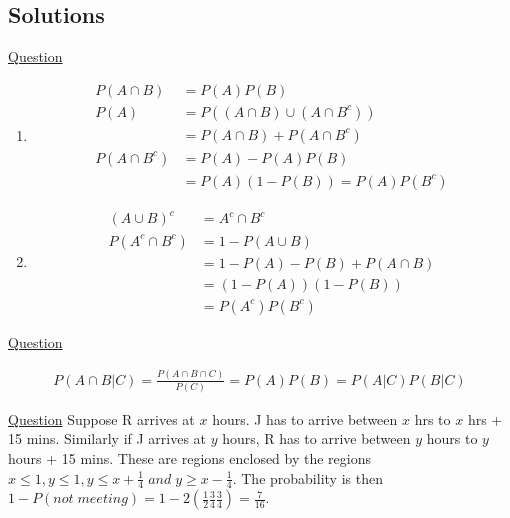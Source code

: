 \documentclass[../probability-notes.tex]{subfiles}
\begin{document}
    \subsection{Solutions}
    \begin{enumerate}
        \item \hypertarget{a_indcomp}{\hyperlink{q_indcomp}{Question}}
        \begin{enumerate}
            \item 
            \begin{align*}
                P(A \cap B) &= P(A) P(B)\\
                P(A) &= P((A \cap B) \cup (A \cap B^{c}))\\
                    &= P(A \cap B) + P(A \cap B^{c}) \tag*{since disjoint}\\
                P(A \cap B^{c}) &= P(A) - P(A)P(B)\\
                    &= P(A)(1 - P(B)) = P(A)P(B^{c})
            \end{align*}
            \item 
            \begin{align*}
                (A \cup B)^{c} &= A^{c} \cap B^{c}\\
                P(A^{c} \cap B^{c}) &= 1 - P(A \cup B)\\
                                &= 1 - P(A) - P(B) + P(A \cap B)\\
                                &= (1 - P(A))(1 - P(B))\\
                                &= P(A^{c})P(B^{c})
            \end{align*}
        \end{enumerate}

        \item \hypertarget{a_conind}{\hyperlink{q_conind}{Question}}
        \begin{align*}
            P(A \cap B | C) = \frac{P(A \cap B \cap C)}{P(C)} = P(A)P(B) = P(A|C)P(B|C) \tag*{Due to independence}
        \end{align*}

        \hypertarget{a_geomeet}{\item} \hyperlink{q_geomeet}{Question} \newline
        Suppose R arrives at $x$ hours. J has to arrive between $x$ hrs to $x$ hrs + 15 mins. Similarly if J arrives at $y$ hours, R has to arrive between $y$ hours to $y$ hours + 15 mins. These are regions enclosed by the regions $x \leq 1, y \leq 1, y \leq x + \frac{1}{4} \;and\; y \geq x - \frac{1}{4}$. The probability is then $ 1 - P(not\;meeting) = 1 - 2(\frac{1}{2} \frac{3}{4} \frac{3}{4}) = \frac{7}{16}$.
    

\end{enumerate}
\end{document}
